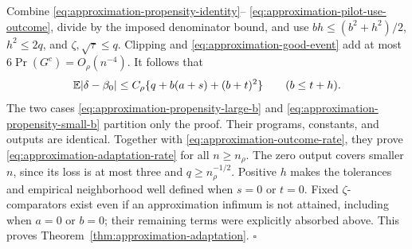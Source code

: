 Combine \eqref{eq:approximation-propensity-identity}--
\eqref{eq:approximation-pilot-use-outcome}, divide by the imposed
denominator bound, and use $bh\le(b^2+h^2)/2$, $h^2\le2q$,
and $\zeta,\sqrt\tau\le q$. Clipping and
\eqref{eq:approximation-good-event} add at most
$6\Pr(G^c)=O_\rho(n^{-4})$. It follows that
\begin{equation}
 \mathbb E|\delta-\beta_0|
 \le C_\rho\{q+b(a+s)+(b+t)^2\}
 \qquad(b\le t+h).
 \label{eq:approximation-propensity-small-b}
\end{equation}
The two cases \eqref{eq:approximation-propensity-large-b} and
\eqref{eq:approximation-propensity-small-b} partition only the proof.
Their programs, constants, and outputs are identical. Together with
\eqref{eq:approximation-outcome-rate}, they prove
\eqref{eq:approximation-adaptation-rate} for all $n\ge n_\rho$.
The zero output covers smaller $n$, since its loss is at most three
and $q\ge n_\rho^{-1/2}$. Positive $h$ makes the tolerances and
empirical neighborhood well defined when $s=0$ or $t=0$. Fixed
$\zeta$-comparators exist even if an approximation infimum is not
attained, including when $a=0$ or $b=0$; their remaining terms were
explicitly absorbed above. This proves
Theorem~\ref{thm:approximation-adaptation}. \hfill$\square$
